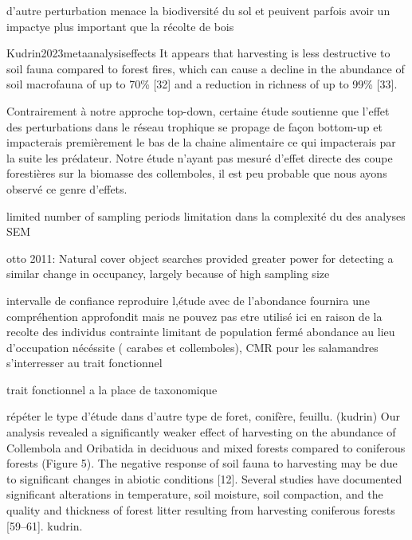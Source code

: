 
d'autre perturbation menace la biodiversité du sol et peuivent parfois avoir un impactye plus important que la récolte de bois

 Kudrin2023metaanalysiseffects
 It appears that harvesting is less destructive to soil fauna compared to forest fires, which can cause a decline in the abundance of soil macrofauna of up to 70\% [32] and a reduction in richness of up to 99\% [33].


Contrairement à notre approche top-down, certaine étude soutienne que l'effet des perturbations dans le réseau trophique se propage de façon bottom-up et impacterais premièrement le bas de la chaine alimentaire ce qui impacterais par la suite les prédateur.
Notre étude n'ayant pas mesuré d'effet directe des coupe forestières sur la biomasse des collemboles, il est peu probable que nous ayons observé ce genre d'effets. 

  limited number of sampling periods
  limitation dans la complexité du des analyses SEM

  otto 2011:
  Natural cover object searches provided greater power for detecting a similar change in occupancy, largely because of high sampling size

    intervalle de confiance
  reproduire l,étude avec de l'abondance fournira une compréhention approfondit mais ne pouvez pas etre utilisé ici en raison de la recolte des individus
  contrainte limitant de population fermé
  abondance au lieu d'occupation nécéssite ( carabes et collemboles), CMR pour les salamandres
  s'interresser au trait fonctionnel 

  trait fonctionnel a la place de taxonomique


  répéter le type d'étude dans d'autre type de foret, conifère, feuillu. (kudrin)
  Our analysis revealed a significantly weaker effect of harvesting on the abundance of Collembola and Oribatida in deciduous and mixed forests compared to coniferous forests (Figure 5). The negative response of soil fauna to harvesting may be due to significant changes in abiotic conditions [12]. Several studies have documented significant alterations in temperature, soil moisture, soil compaction, and the quality and thickness of forest litter resulting from harvesting coniferous forests [59–61]. kudrin.


